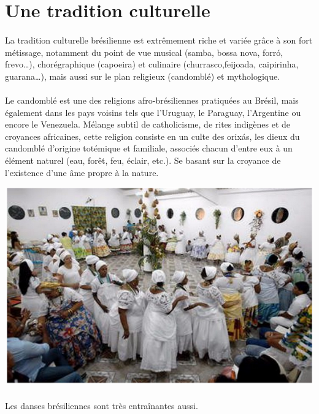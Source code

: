 \section{Une tradition culturelle}

\paragraph{} La tradition culturelle brésilienne est extrêmement riche et
variée grâce à son fort métissage, notamment du point de vue musical (samba,
bossa nova, forró, frevo\ldots), chorégraphique (capoeira) et culinaire
(churrasco,feijoada, caipirinha, guarana\ldots), mais aussi sur le plan religieux
(candomblé) et mythologique.

\paragraph{} Le candomblé est une des religions afro-brésiliennes pratiquées au
Brésil, mais également dans les pays voisins tels que l'Uruguay, le Paraguay,
l'Argentine ou encore le Venezuela. Mélange subtil de catholicisme, de rites
indigènes et de croyances africaines, cette religion consiste en un culte des
orixás, les dieux du candomblé d'origine totémique et familiale, associés
chacun d'entre eux à un élément naturel (eau, forêt, feu, éclair, etc.). Se
basant sur la croyance de l'existence d'une âme propre à la nature.

\begin{center}
	\includegraphics[scale=0.5]{bresil3.png}
\end{center}

\paragraph{} Les danses brésiliennes sont très entraînantes aussi.

